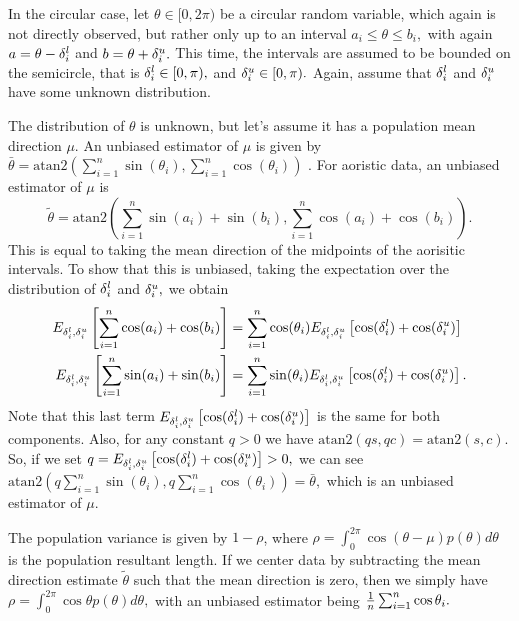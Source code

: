In the circular case, let $\theta \in [0, 2\pi)$ be a circular random variable, which again  is not directly observed, but rather only up to an interval $a_i \leq \theta \leq b_i,$ with again $a = \theta - {\delta^l_i}$ and $b = \theta + {\delta^u_i}.$ This time, the intervals are assumed to be bounded on the semicircle, that is ${\delta^l_i} \in [0, \pi),$ and ${\delta^u_i} \in [0, \pi).$ Again, assume that ${\delta^l_i}$ and ${\delta^u_i}$ have some unknown distribution.

The distribution of $\theta$ is unknown, but let's assume it has a population mean direction $\mu$. An unbiased estimator of $\mu$ is given by $\bar\theta = \text{atan2}(\sum_{i=1}^n \sin(\theta_i), \sum_{i=1}^n \cos(\theta_i))$ \citep{mardia2009directional}. For aoristic data, an unbiased estimator of $\mu$ is
\begin{equation}
\tilde\theta = \text{atan2} \left( \sum_{i=1}^n \sin(a_i) + \sin(b_i), \sum_{i=1}^n \cos(a_i) + \cos(b_i) \right).
\end{equation}
This is equal to taking the mean direction of the midpoints of the aorisitic intervals. To show that this is unbiased, taking the expectation over the distribution of ${\delta^l_i}$ and ${\delta^u_i},$ we obtain
\begin{align}
E_{{\delta^l_i}, {\delta^u_i}} \left[\sum_{i=1}^n \cos(a_i) + \cos(b_i)\right] &= \sum_{i=1}^n \cos(\theta_i) E_{{\delta^l_i}, {\delta^u_i}} \left[ \cos({\delta^l_i}) + \cos({\delta^u_i}) \right] \\
E_{{\delta^l_i}, {\delta^u_i}} \left[\sum_{i=1}^n \sin(a_i) + \sin(b_i)\right] &= \sum_{i=1}^n \sin(\theta_i) E_{{\delta^l_i}, {\delta^u_i}} \left[ \cos({\delta^l_i}) + \cos({\delta^u_i}) \right].
\end{align}
Note that this last term $E_{{\delta^l_i}, {\delta^u_i}} \left[ \cos({\delta^l_i}) + \cos({\delta^u_i}) \right]$ is the same for both components. Also, for any constant $q > 0$ we have $\text{atan2}(qs, qc) = \text{atan2}(s, c).$ So, if we set $q = E_{{\delta^l_i}, {\delta^u_i}} \left[ \cos({\delta^l_i}) + \cos({\delta^u_i}) \right] > 0,$ we can see $\text{atan2}(q \sum_{i=1}^n \sin(\theta_i), q \sum_{i=1}^n \cos(\theta_i)) = \bar\theta,$ which is an unbiased estimator of $\mu$.

The population variance is given by $1 - \rho$, where $\rho = \int_0^{2\pi} \cos(\theta - \mu) p(\theta) d\theta$ is the population resultant length. If we center data by subtracting the mean direction estimate  $\tilde\theta$ such that the mean direction is zero, then we simply have $\rho = \int_0^{2\pi} \cos\theta p(\theta) d\theta,$ with an unbiased estimator being $\frac{1}{n}\sum_{i=1}^n \cos\theta_i.$

